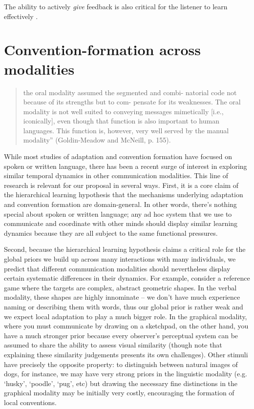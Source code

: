 \documentclass[11pt, floatsintext, jou]{apa6}
\begin{document}
The ability to actively \emph{give} feedback is also critical for the listener to learn effectively \cite{SchoberClark89_Overhearers}. 


\section{Convention-formation across modalities}

\begin{quote}
the oral modality assumed the segmented and combi- natorial code not because of its strengths but to com- pensate for its weaknesses. The oral modality is not well suited to conveying messages mimetically [i.e., iconically], even though that function is also important to human languages. This function is, however, very well served by the manual modality'' (Goldin-Meadow and McNeill, p. 155).
\end{quote}

While most studies of adaptation and convention formation have focused on spoken or written language, there has been a recent surge of interest in exploring similar temporal dynamics in other communication modalities. This line of research is relevant for our proposal in several ways. First, it is a core claim of the hierarchical learning hypothesis that the mechanisms underlying adaptation and convention formation are domain-general. In other words, there's nothing special about spoken or written language; any ad hoc system that we use to communicate and coordinate with other minds should display similar learning dynamics because they are all subject to the same functional pressures. 

Second, because the hierarchical learning hypothesis claims a critical role for the global priors we build up across many interactions with many individuals, we predict that different communication modalities should nevertheless display certain systematic differences in their dynamics. For example, consider a reference game where the targets are complex, abstract geometric shapes. In the verbal modality, these shapes are highly innominate -- we don't have much experience naming or describing them with words, thus our global prior is rather weak and we expect local adaptation to play a much bigger role. In the graphical modality, where you must communicate by drawing on a sketchpad, on the other hand, you have a much stronger prior because every observer's perceptual system can be assumed to share the ability to assess visual similarity (though note that explaining these similarity judgements presents its own challenges). Other stimuli have precisely the opposite property: to distinguish between natural images of dogs, for instance, we may have very strong priors in the linguistic modality (e.g. `husky', `poodle', `pug', etc) but drawing the necessary fine distinctions in the graphical modality may be initially very costly, encouraging the formation of local conventions. 
\end{document}
